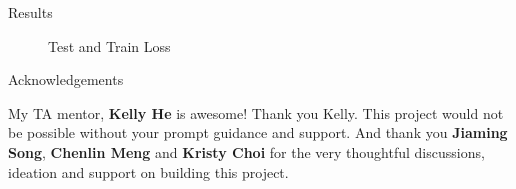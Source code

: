 \documentclass[final]{beamer}
\newlength{\onecolwid}
\begin{document}
\begin{frame}[t]
\begin{columns}[t]
\begin{column}{\onecolwid}
\begin{block}{Results}
\begin{figure}
    \centering
    \qquad
    \caption{Test and Train Loss}%
\end{figure}


\end{block}


\begin{block}{Acknowledgements}

My TA mentor, \textbf{Kelly He} is awesome! Thank you Kelly. This project would not be possible without your prompt guidance and support. And thank you \textbf{Jiaming Song}, \textbf{Chenlin Meng} and \textbf{Kristy Choi} for the very thoughtful discussions, ideation and support on building this project.


\end{block}



\end{column}
\end{columns}
\end{frame}
\end{document}
